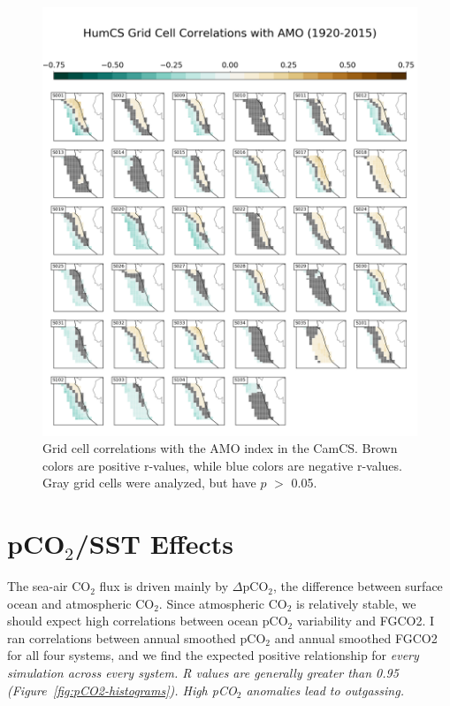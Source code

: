 \documentclass[12pt]{article}
\begin{document}
\begin{figure}[!h]
	\centering
	\includegraphics[width=\linewidth]{../../figs/humcs/spatial-correlations/humcs-grid-cell-correlations-amo-postage.png}
	\caption{Grid cell correlations with the AMO index in the CamCS. Brown colors are positive r-values, while blue colors are negative r-values. Gray grid cells were analyzed, but have $p$ $>$ 0.05.}
	\label{fig:CanCS-AMO-Spatial}
\end{figure}

\clearpage
\section{pCO$_{2}$/SST Effects}
The sea-air CO$_{2}$ flux is driven mainly by $\Delta$pCO$_{2}$, the difference between surface ocean and atmospheric CO$_{2}$. Since atmospheric CO$_{2}$ is relatively stable, we should expect high correlations between ocean pCO$_{2}$ variability and FGCO2. I ran correlations between annual smoothed pCO$_{2}$ and annual smoothed FGCO2 for all four systems, and we find the expected positive relationship for \it every \rm simulation across \it every \rm system. R values are generally greater than 0.95 (Figure~\ref{fig:pCO2-histograms}). High pCO$_{2}$ anomalies lead to outgassing. \\
\end{document}
